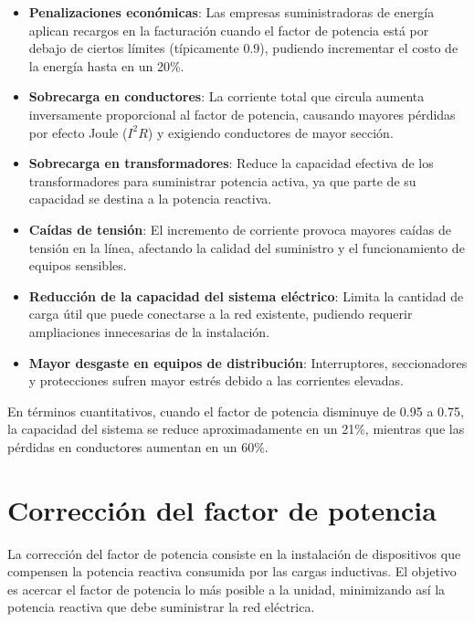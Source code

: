 \documentclass{report}          %
\begin{document}
                \begin{itemize}
                    \item \textbf{Penalizaciones económicas}: Las empresas suministradoras de energía aplican recargos en la facturación cuando el factor de potencia está por debajo de ciertos límites (típicamente 0.9), pudiendo incrementar el costo de la energía hasta en un 20\%.
                    
                    \item \textbf{Sobrecarga en conductores}: La corriente total que circula aumenta inversamente proporcional al factor de potencia, causando mayores pérdidas por efecto Joule ($I^2R$) y exigiendo conductores de mayor sección.
                    
                    \item \textbf{Sobrecarga en transformadores}: Reduce la capacidad efectiva de los transformadores para suministrar potencia activa, ya que parte de su capacidad se destina a la potencia reactiva.
                    
                    \item \textbf{Caídas de tensión}: El incremento de corriente provoca mayores caídas de tensión en la línea, afectando la calidad del suministro y el funcionamiento de equipos sensibles.
                    
                    \item \textbf{Reducción de la capacidad del sistema eléctrico}: Limita la cantidad de carga útil que puede conectarse a la red existente, pudiendo requerir ampliaciones innecesarias de la instalación.
                    
                    \item \textbf{Mayor desgaste en equipos de distribución}: Interruptores, seccionadores y protecciones sufren mayor estrés debido a las corrientes elevadas.
                \end{itemize}
        
                En términos cuantitativos, cuando el factor de potencia disminuye de 0.95 a 0.75, la capacidad del sistema se reduce aproximadamente en un 21\%, mientras que las pérdidas en conductores aumentan en un 60\%.

        \section{Corrección del factor de potencia}
            La corrección del factor de potencia consiste en la instalación de dispositivos que compensen la potencia reactiva consumida por las cargas inductivas. El objetivo es acercar el factor de potencia lo más posible a la unidad, minimizando así la potencia reactiva que debe suministrar la red eléctrica.
            
\end{document}
